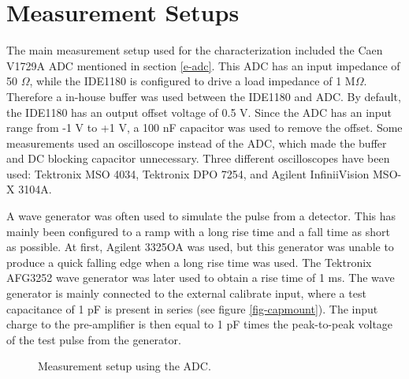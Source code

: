 \documentclass[../main/thesis.tex]{subfiles}
\begin{document}
\section{Measurement Setups}
\label{ide-setup}

The main measurement setup used for the characterization included the Caen V1729A \gls{ADC} mentioned in section \ref{e-adc}. This \gls{ADC} has an input impedance of 50 $\Omega$, while the IDE1180 is configured to drive a load impedance of 1 M$\Omega$. Therefore a in-house buffer was used between the IDE1180 and ADC. By default, the IDE1180 has an output offset voltage of 0.5 V. Since the ADC has an input range from -1 V to +1 V, a 100 nF capacitor was used to remove the offset. Some measurements used an oscilloscope instead of the ADC, which made the buffer and DC blocking capacitor unnecessary. Three different oscilloscopes have been used: Tektronix MSO 4034, Tektronix DPO 7254, and Agilent InfiniiVision MSO-X 3104A. 

A wave generator was often used to simulate the pulse from a detector. This has mainly been configured to a ramp with a long rise time and a fall time as short as possible. At first, Agilent 3325OA was used, but this generator was unable to produce a quick falling edge when a long rise time was used. The Tektronix AFG3252 wave generator was later used to obtain a rise time of 1 ms. The wave generator is mainly connected to the external calibrate input, where a test capacitance of 1 pF is present in series (see figure \ref{fig-capmount}). The input charge to the pre-amplifier is then equal to 1 pF times the peak-to-peak voltage of the test pulse from the generator. 

\begin{figure}
\centering
{}
\caption{Measurement setup using the ADC.}
\label{fig-setup-adc}
\end{figure}
\end{document}
